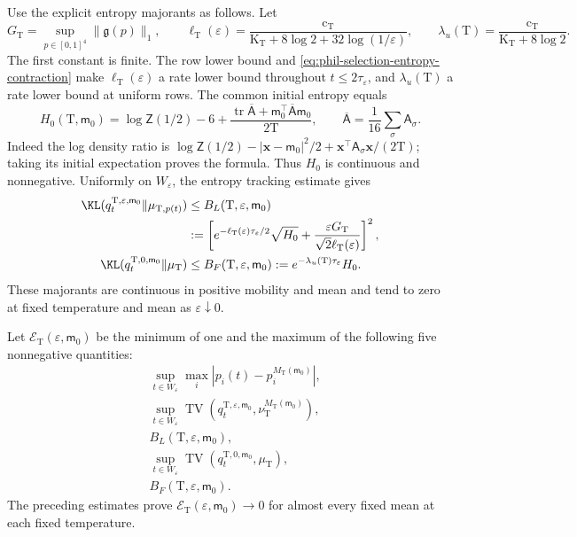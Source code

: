 Use the explicit entropy majorants as follows. Let
\[
 G_{\mathrm T}=\sup_{p\in[0,1]^4}\|\mathfrak g(p)\|_1,\qquad
 \ell_{\mathrm T}(\varepsilon)
 =\frac{\mathrm c_{\mathrm T}}
 {\mathrm K_{\mathrm T}+8\log2+32\log(1/\varepsilon)},\qquad
 \lambda_u(\mathrm T)
 =\frac{\mathrm c_{\mathrm T}}{\mathrm K_{\mathrm T}+8\log2}.
\]
The first constant is finite. The row lower bound and
\cref{eq:phil-selection-entropy-contraction} make
\(\ell_{\mathrm T}(\varepsilon)\) a rate lower bound throughout
\(t\le2\tau_\varepsilon\), and \(\lambda_u(\mathrm T)\) a rate lower
bound at uniform rows. The common initial entropy equals
\[
 H_0(\mathrm T,\mathsf m_0)
 =\log\mathsf Z(1/2)-6+
 \frac{\operatorname{tr}\overline{\mathsf A}
              +\mathsf m_0^\top\overline{\mathsf A}\mathsf m_0}
      {2\mathrm T},
 \qquad
 \overline{\mathsf A}=\frac1{16}\sum_\sigma\mathsf A_\sigma.
\]
Indeed the log density ratio is
\(\log\mathsf Z(1/2)-|\mathbf x-\mathsf m_0|^2/2+
\mathbf x^\top\mathsf A_\sigma\mathbf x/(2\mathrm T)\);
taking its initial expectation proves the formula.
Thus \(H_0\) is continuous and nonnegative. Uniformly on
\(W_\varepsilon\), the entropy tracking estimate gives
\[
 \begin{aligned}
 \KL(q_t^{\mathrm T,\varepsilon,\mathsf m_0}
               \Vert\mu_{\mathrm T,p(t)})
 &\le B_L(\mathrm T,\varepsilon,\mathsf m_0)\\
 &:=\left[
 e^{-\ell_{\mathrm T}(\varepsilon)\tau_\varepsilon/2}\sqrt{H_0}
 +\frac{\varepsilon G_{\mathrm T}}
             {\sqrt2\ell_{\mathrm T}(\varepsilon)}
 \right]^2,\\
 \KL(q_t^{\mathrm T,0,\mathsf m_0}\Vert\mu_{\mathrm T})
 &\le B_F(\mathrm T,\varepsilon,\mathsf m_0)
 :=e^{-\lambda_u(\mathrm T)\tau_\varepsilon}H_0.
 \end{aligned}
\]
These majorants are continuous in positive mobility and mean and tend
to zero at fixed temperature and mean as \(\varepsilon\downarrow0\).

Let \(\mathcal E_{\mathrm T}(\varepsilon,\mathsf m_0)\) be the minimum
of one and the maximum of the following five nonnegative quantities:
\[
 \begin{aligned}
 &\sup_{t\in W_\varepsilon}
          \max_i|p_i(t)-p_i^{M_{\mathrm T}(\mathsf m_0)}|,\\
 &\sup_{t\in W_\varepsilon}
       \operatorname{TV}
       (q_t^{\mathrm T,\varepsilon,\mathsf m_0},
                   \nu_{\mathrm T}^{M_{\mathrm T}(\mathsf m_0)}),\\
 &B_L(\mathrm T,\varepsilon,\mathsf m_0),\\
 &\sup_{t\in W_\varepsilon}
       \operatorname{TV}
          (q_t^{\mathrm T,0,\mathsf m_0},\mu_{\mathrm T}),\\
 &B_F(\mathrm T,\varepsilon,\mathsf m_0).
 \end{aligned}
\]
The preceding estimates prove
\(\mathcal E_{\mathrm T}(\varepsilon,\mathsf m_0)\to0\)
for almost every fixed mean at each fixed temperature.

